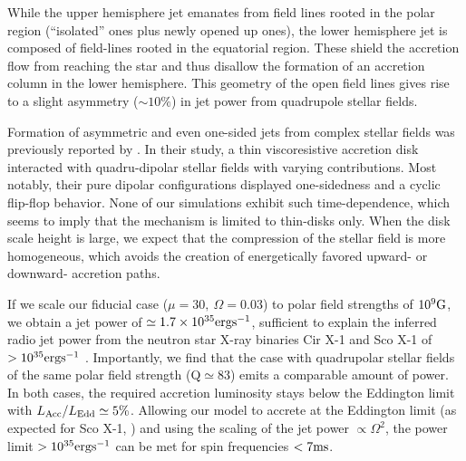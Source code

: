 \documentclass[fleqn,usenatbib]{mnras}
\begin{document}
While the upper hemisphere jet emanates from field lines rooted in the polar region (``isolated'' ones plus newly opened up ones), the lower hemisphere jet is composed of field-lines rooted in the equatorial region.  These shield the accretion flow from reaching the star and thus disallow the formation of an accretion column in the lower hemisphere. 
This geometry of the open field lines gives rise to a slight asymmetry ($\sim 10\%$) in jet power from quadrupole stellar fields.   

Formation of asymmetric and even one-sided jets from complex stellar fields was previously reported by \citet{Lovelace2010}.  In their study, a thin viscoresistive accretion disk interacted with  quadru-dipolar stellar fields with varying contributions.  Most notably, their pure dipolar configurations displayed one-sidedness and a cyclic flip-flop behavior. None of our simulations exhibit such time-dependence, which seems to imply that the mechanism is limited to thin-disks only.  When the disk scale height is large, we expect that the compression of the stellar field is more homogeneous, which avoids the creation of energetically favored upward- or downward- accretion paths.  

If we scale our fiducial case ($\mu=30,\ \Omega=0.03$) to polar field strengths of $10^9\rm G$, we obtain a jet power of $\simeq 1.7\times 10^{35} \rm erg s^{-1}$, sufficient to explain the inferred radio jet power from the neutron star X-ray binaries Cir X-1 and Sco X-1 of $>10^{35} \rm erg s^{-1}$ \citep{FenderWuEtAl2004}. Importantly, we find that the case with quadrupolar stellar fields of the same polar field strength (Q$\simeq83$) emits a comparable amount of power.  In both cases, the required accretion luminosity stays below the Eddington limit with $L_{\rm Acc}/L_{\rm Edd}\simeq5\%$.  Allowing our model to accrete at the Eddington limit (as expected for Sco X-1, \citealt{BradshawFomalontEtAl1999}) and using the scaling of the jet power $\propto\Omega^2$, the power limit $>10^{35}\rm erg s^{-1}$ can be met for spin frequencies $<7\rm ms$.  
\end{document}
